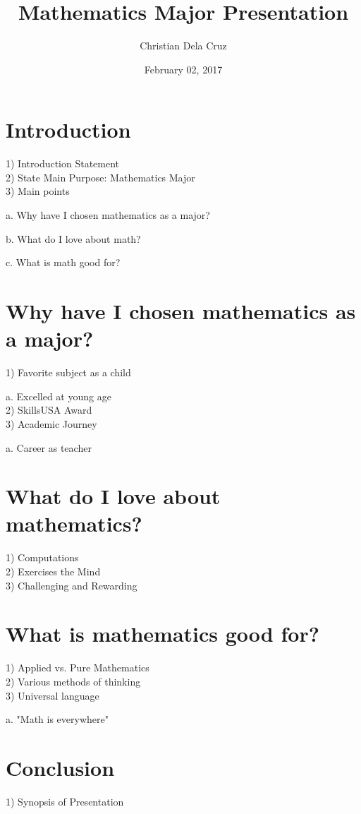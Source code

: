 \documentclass[12pt, oneside]{article}   	%
\title{Mathematics Major Presentation}
\author{Christian Dela Cruz}
\date{February 02, 2017}							%
\begin{document}
{\selectfont
}	
\maketitle
\section{Introduction}
1) Introduction Statement\\
2) State Main Purpose: Mathematics Major\\
3) Main points\par
a. Why have I chosen mathematics as a major?\par	
b. What do I love about math?\par
c. What is math good for?\\
\section{Why have I chosen mathematics as a major?}
1) Favorite subject as a child\par
a. Excelled at young age\\
2) SkillsUSA Award\\
3) Academic Journey\par
a. Career as teacher\\
\section{What do I love about mathematics?}
1) Computations\\
2) Exercises the Mind\\
3) Challenging and Rewarding\\
\section{What is mathematics good for?}
1) Applied vs. Pure Mathematics\\
2) Various methods of thinking\\
3) Universal language\par
a. "Math is everywhere"\\
\section{Conclusion}
1) Synopsis of Presentation
\end{document}
